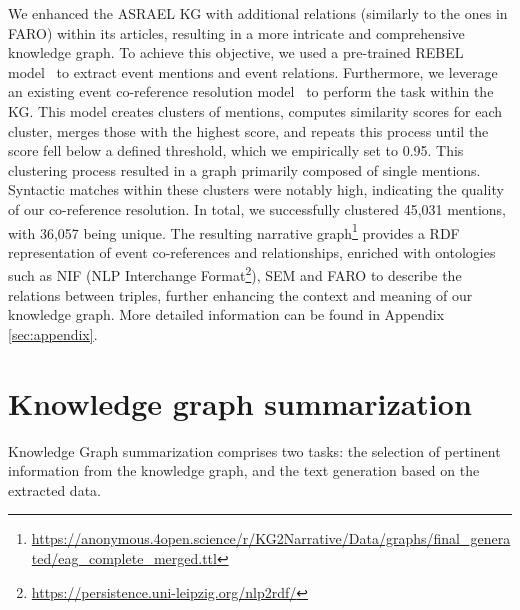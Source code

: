 \documentclass[
hf, %
]{ceurart}
\begin{document}
We enhanced the ASRAEL KG with additional relations (similarly to the ones in FARO) within its articles, resulting in a more intricate and comprehensive knowledge graph. To achieve this objective, we used a pre-trained REBEL model~\cite{REBEL} to extract event mentions and event relations. Furthermore, we leverage an existing event co-reference resolution model~\cite{barhom-etal-2019-revisiting} to perform the task within the KG. This model creates clusters of mentions, computes similarity scores for each cluster, merges those with the highest score, and repeats this process until the score fell below a defined threshold, which we empirically set to 0.95. This clustering process resulted in a graph primarily composed of single mentions. Syntactic matches within these clusters were notably high, indicating the quality of our co-reference resolution. In total, we successfully clustered 45,031 mentions, with 36,057 being unique. The resulting narrative graph\footnote{
	\url{https://anonymous.4open.science/r/KG2Narrative/Data/graphs/final_generated/eag_complete_merged.ttl}
} provides a RDF representation of event co-references and relationships, enriched with ontologies such as NIF (NLP Interchange Format\footnote{\url{https://persistence.uni-leipzig.org/nlp2rdf/}}), SEM and FARO to describe the relations between triples, further enhancing the context and meaning of our knowledge graph. More detailed information can be found in Appendix \ref{sec:appendix}.

\section{Knowledge graph summarization}
\label{sec:KGS}
Knowledge Graph summarization comprises two tasks: the selection of pertinent information from the knowledge graph, and the text generation based on the extracted data.
\end{document}
